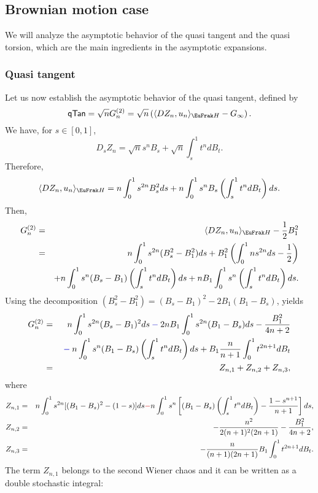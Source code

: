 \documentclass[a4paper]{article}
\newcommand{\colred}{\color[rgb]{0.8,0,0}}
\newcommand{\colorb}{\color[rgb]{0,0,0.8}}
\newcommand{\colred}{\color{black}}%
\newcommand{\colorb}{\color{black}}%
\numberwithin{equation}{section}
\def\HH{\EuFrak H}
\begin{document}
\subsection{Brownian motion case} %
 
 We will analyze the asymptotic behavior of the quasi  tangent and the quasi torsion, which are the main ingredients in the asymptotic  expansions. 
\subsubsection{Quasi tangent}\label{170805-2} 
Let us now establish  the asymptotic  behavior of the quasi tangent, defined by
\[
{\sf qTan}=\sqrt{n} G_n^{(2)}=\sqrt{n} \left( \langle DZ_n, u_n \rangle_{\HH} -G_\infty \right).
\]
We have, for $s\in [0,1]$,
\[
D_sZ_n=\sqrt{n}  s^n B_s + \sqrt{n} \int_s^1 t^n dB_t.
\]
Therefore,
\[
 \langle DZ_n, u_n \rangle_{\HH}= n \int_0^1 s^{2n} B_s^2 ds + n \int_0^1 s^n B_s \left( \int_s^1 t^n dB_t \right) ds.
 \]
 Then, 
 \begin{eqnarray*}
 G^{(2)}_n&=&  \langle DZ_n, u_n \rangle_{\HH} -\frac 12 B_1^2 \\
  &=&
  n \int_0^1 s^{2n} (B_s^2-B_1^2) ds + B_1^2 \left( \int_0^1 ns^{2n} ds -\frac 12 \right) \\
  &&+n \int_0^1 s^n (B_s-B_1) \left( \int_s^1 t^n dB_t \right) ds + n B_1 \int_0^1 s^n \left( \int_s^1 t^n dB_t \right) ds. 
 \end{eqnarray*}
 Using the decomposition $(B_s^2-B_1^2) =(B_s-B_1)^2- 2B_1 (B_1-B _s)$, yields
  \begin{eqnarray*}
 G^{(2)}_n&=& n \int_0^1 s^{2n}(B_s-B_1)^2ds
 {\colorb \>-\>}2nB_1 \int_0^1 s^{2n}(B_1-B_s)ds -\frac {B_1^2} {4n+2}\\
 &&
 {\colorb \>-\>}n \int_0^1 s^n (B_1-B_s) \left( \int_s^1 t^n dB_t \right) ds + B_1 \frac n{n+1} \int_0^1t^{2n+1} dB_t\\
 &=& Z_{n,1} + Z_{n,2} + Z_{n,3},
  \end{eqnarray*}
  where
   \begin{eqnarray*}
  Z_{n,1} &=&n \int_0^1 s^{2n}[(B_1-B_s)^2- (1-s)]ds 
  {\colred -}n \int_0^1 s^n \left[ (B_1-B_s) \left( \int_s^1 t^n dB_t \right) -\frac {1-s^{n+1}}{n+1} \right] ds , \\
  Z_{n,2} &=& -\frac { n^2} {2(n+1)^2 (2n+1)} -\frac {B_1^2} {4n+2}, \\
  Z_{n,3}&=& - \frac { n} {( n+1) (2n+1)} B_1 \int_0^1 t^{2n+1} dB_t.
  \end{eqnarray*}
  The term $Z_{n,1}$ belongs to the second Wiener chaos and  it can be written as a double stochastic integral:
\end{document}
